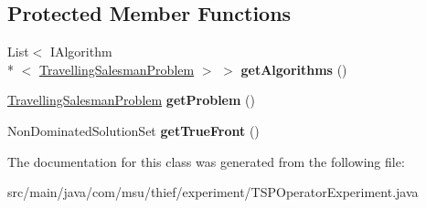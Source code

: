 \subsection*{Protected Member Functions}
\begin{DoxyCompactItemize}
\item 
\hypertarget{classcom_1_1msu_1_1thief_1_1experiment_1_1TSPOperatorExperiment_a7e970c51a378d6e1c9d4a36bc815afe9}{List$<$ I\-Algorithm\\*
$<$ \hyperlink{classcom_1_1msu_1_1tsp_1_1TravellingSalesmanProblem}{Travelling\-Salesman\-Problem} $>$ $>$ {\bfseries get\-Algorithms} ()}\label{classcom_1_1msu_1_1thief_1_1experiment_1_1TSPOperatorExperiment_a7e970c51a378d6e1c9d4a36bc815afe9}

\item 
\hypertarget{classcom_1_1msu_1_1thief_1_1experiment_1_1TSPOperatorExperiment_af0ccec33727502527d72e691c3d53b5a}{\hyperlink{classcom_1_1msu_1_1tsp_1_1TravellingSalesmanProblem}{Travelling\-Salesman\-Problem} {\bfseries get\-Problem} ()}\label{classcom_1_1msu_1_1thief_1_1experiment_1_1TSPOperatorExperiment_af0ccec33727502527d72e691c3d53b5a}

\item 
\hypertarget{classcom_1_1msu_1_1thief_1_1experiment_1_1TSPOperatorExperiment_aa197dc736547d3d1bd0239a23ba3145c}{Non\-Dominated\-Solution\-Set {\bfseries get\-True\-Front} ()}\label{classcom_1_1msu_1_1thief_1_1experiment_1_1TSPOperatorExperiment_aa197dc736547d3d1bd0239a23ba3145c}

\end{DoxyCompactItemize}


The documentation for this class was generated from the following file\-:\begin{DoxyCompactItemize}
\item 
src/main/java/com/msu/thief/experiment/T\-S\-P\-Operator\-Experiment.\-java\end{DoxyCompactItemize}
